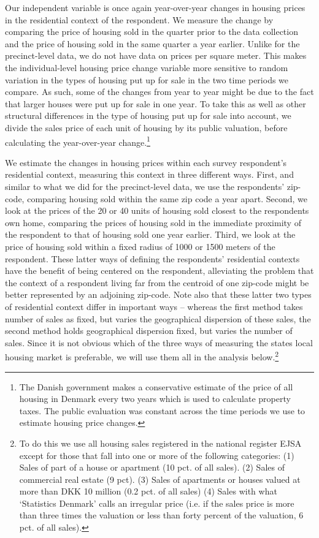 \documentclass[12pt,a4paper]{article}
\begin{document}
	Our independent variable is once again year-over-year changes in housing prices in the residential context of the respondent. We measure the change by comparing the price of housing sold in the quarter prior to the data collection and the price of housing sold in the same quarter a year earlier. Unlike for the precinct-level data, we do not have data on prices per square meter. This makes the individual-level housing price change variable more sensitive to random variation in the types of housing put up for sale in the two time periods we compare. As such, some of the changes from year to year might be due to the fact that larger houses were put up for sale in one year. To take this as well as other structural differences in the type of housing put up for sale into account, we divide the sales price of each unit of housing by its public valuation, before calculating the year-over-year change.\footnote{The Danish government makes a conservative estimate of the price of all housing in Denmark every two years which is used to calculate property taxes. The public evaluation was constant across the time periods we use to estimate housing price changes.}
	
	We estimate the changes in housing prices within each survey respondent's residential context, measuring this context in three different ways. First, and similar to what we did for the precinct-level data, we use the respondents’ zip-code, comparing housing sold within the same zip code a year apart. Second, we look at the prices of the 20 or 40 units of housing sold closest to the respondents own home, comparing the prices of housing sold in the immediate proximity of the respondent to that of housing sold one year earlier. Third, we look at the price of housing sold within a fixed radius of 1000 or 1500 meters of the respondent. These latter ways of defining the respondents’ residential contexts have the benefit of being centered on the respondent, alleviating the problem that the context of a respondent living far from the centroid of one zip-code might be better represented by an adjoining zip-code. Note also that these latter two types of residential context differ in important ways -- whereas the first method takes number of sales as fixed, but varies the geographical dispersion of these sales, the second method holds geographical dispersion fixed, but varies the number of sales. Since it is not obvious which of the three ways of measuring the states local housing market is preferable, we will use them all in the analysis below.\footnote{To do this we use all housing sales registered in the national register EJSA except for those that fall into one or more of the following categories: (1) Sales of part of a house or apartment (10 pct. of all sales). (2) Sales of commercial real estate (9 pct). (3) Sales of apartments or houses valued at more than DKK 10 million (0.2 pct. of all sales) (4) Sales with what `Statistics Denmark' calls an irregular price (i.e. if the sales price is more than three times the valuation or less than forty percent of the valuation, 6 pct. of all sales).}
	
\end{document}
